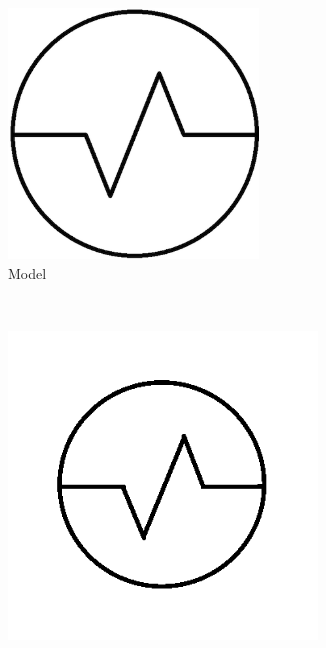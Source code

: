     \begin{figure}[h]
        \centering
                \begin{subfigure}[b]{0.2\textwidth}
                \centering
                \includegraphics[width=0.73\textwidth]{figures/Results/Sketches150/Model.png}
                \caption{Model}
        \end{subfigure}\\
                \begin{subfigure}[b]{0.25\textwidth}
                \centering
                \includegraphics[width=0.9\textwidth]{figures/Results/Sketches150/level1.png}

\end{subfigure}
\end{figure}
